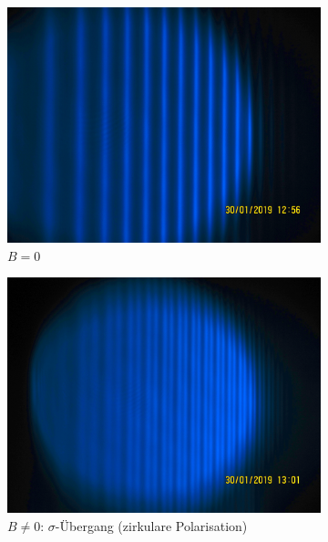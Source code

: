 \begin{figure}[h!]
   \begin{subfigure}{0.49\textwidth}
      \includegraphics[width=\textwidth]{blauohneb.jpeg}
      \caption{$B=0$}
      \label{fig:blauohneb}
   \end{subfigure}
   \begin{subfigure}{0.49\textwidth}
      \includegraphics[width=\textwidth]{blausigma.jpeg}
      \caption{$B≠0$: $\sigma$-Übergang (zirkulare Polarisation)}
      \label{fig:blausigma}
   \end{subfigure}\\
   \centering
   \begin{subfigure}{0.49\textwidth}

\end{subfigure}
\end{figure}
